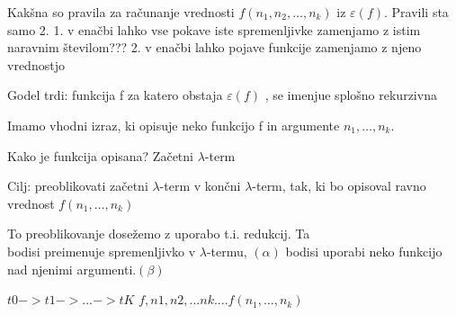 \documentclass[10pt,a4paper,oneside]{book}
\begin{document}
Kakšna so pravila za računanje vrednosti $f(n_1, n_2, \dots, n_k)$ iz $\varepsilon(f)$. %
Pravili sta samo 2.
1. v enačbi lahko vse pokave iste spremenljivke zamenjamo z istim naravnim številom???
2. v enačbi lahko pojave funkcije zamenjamo z njeno vrednostjo

Godel trdi: funkcija f za katero obstaja $\varepsilon(f)$ , se imenjue splošno rekurzivna%


Imamo vhodni izraz, ki opisuje neko funkcijo f in argumente $n_1, \dots, n_k$.

Kako je funkcija opisana?
Začetni $\lambda$-term

Cilj: preoblikovati začetni $\lambda$-term v končni $\lambda$-term, tak, ki bo opisoval ravno vrednost $f(n_1, \dots, n_k)$

To preoblikovanje dosežemo z uporabo t.i. redukcij. Ta\\
bodisi preimenuje spremenljivko v $\lambda$-termu, $(\alpha)$
bodisi uporabi neko funkcijo nad njenimi argumenti.$(\beta)$ %

$t0->t1->...->tK$
$f, n1, n2, ... nk$....$f(n_1, \dots, n_k)$




\end{document}
